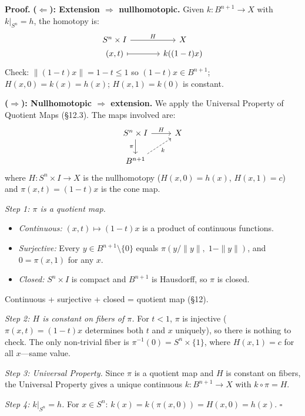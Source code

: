 \documentclass[11pt]{report}
\renewenvironment{proof}[1][Proof]{\noindent\textbf{#1.} }{\hfill$\square$\par\vspace{5pt}}
\begin{document}
\begin{proof}
\textbf{($\Leftarrow$): Extension $\Rightarrow$ nullhomotopic.} Given $k: B^{n+1} \to X$ with $k|_{S^n} = h$, the homotopy is:
\[
\begin{tikzcd}[row sep=small, column sep=large]
S^n \times I \arrow[r, "H"] & X \\[-8pt]
(x, t) \arrow[r, mapsto] & k((1-t)x)
\end{tikzcd}
\]
Check: $\|(1-t)x\| = 1-t \leq 1$ so $(1-t)x \in B^{n+1}$; $H(x,0) = k(x) = h(x)$; $H(x,1) = k(0)$ is constant.

\textbf{($\Rightarrow$): Nullhomotopic $\Rightarrow$ extension.} We apply the Universal Property of Quotient Maps (\S 12.3). The maps involved are:
\[
\begin{tikzcd}
S^n \times I \arrow[r, "H"] \arrow[d, "\pi"'] & X \\
B^{n+1} \arrow[ur, "k"', dashed] &
\end{tikzcd}
\]
where $H: S^n \times I \to X$ is the nullhomotopy ($H(x,0) = h(x)$, $H(x,1) = c$) and $\pi(x, t) = (1-t)x$ is the cone map.

\textit{Step 1: $\pi$ is a quotient map.}
\begin{itemize}[nosep]
    \item \textit{Continuous:} $(x, t) \mapsto (1-t)x$ is a product of continuous functions.
    \item \textit{Surjective:} Every $y \in B^{n+1} \setminus \{0\}$ equals $\pi(y/\|y\|,\; 1 - \|y\|)$, and $0 = \pi(x, 1)$ for any $x$.
    \item \textit{Closed:} $S^n \times I$ is compact and $B^{n+1}$ is Hausdorff, so $\pi$ is closed.
\end{itemize}
Continuous + surjective + closed = quotient map (\S 12).

\textit{Step 2: $H$ is constant on fibers of $\pi$.} For $t < 1$, $\pi$ is injective ($\pi(x,t) = (1-t)x$ determines both $t$ and $x$ uniquely), so there is nothing to check. The only non-trivial fiber is $\pi^{-1}(0) = S^n \times \{1\}$, where $H(x, 1) = c$ for all $x$---same value. \checkmark

\textit{Step 3: Universal Property.} Since $\pi$ is a quotient map and $H$ is constant on fibers, the Universal Property gives a unique continuous $k: B^{n+1} \to X$ with $k \circ \pi = H$.

\textit{Step 4: $k|_{S^n} = h$.} For $x \in S^n$: $k(x) = k(\pi(x, 0)) = H(x, 0) = h(x)$. \checkmark
\end{proof}
\end{document}
